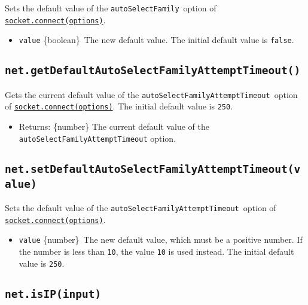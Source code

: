 Sets the default value of the \texttt{autoSelectFamily}~option of
\hyperref[socketconnectoptions-connectlistener]{\texttt{socket.connect(options)}}.

\begin{itemize}
\tightlist
\item
  \texttt{value} \{boolean\}~The new default value. The initial default
  value is \texttt{false}.
\end{itemize}

\subsection{\texorpdfstring{\texttt{net.getDefaultAutoSelectFamilyAttemptTimeout()}}{net.getDefaultAutoSelectFamilyAttemptTimeout()}}\label{net.getdefaultautoselectfamilyattempttimeout}

Gets the current default value of the
\texttt{autoSelectFamilyAttemptTimeout}~option of
\hyperref[socketconnectoptions-connectlistener]{\texttt{socket.connect(options)}}.
The initial default value is \texttt{250}.

\begin{itemize}
\tightlist
\item
  Returns: \{number\} The current default value of the
  \texttt{autoSelectFamilyAttemptTimeout} option.
\end{itemize}

\subsection{\texorpdfstring{\texttt{net.setDefaultAutoSelectFamilyAttemptTimeout(value)}}{net.setDefaultAutoSelectFamilyAttemptTimeout(value)}}\label{net.setdefaultautoselectfamilyattempttimeoutvalue}

Sets the default value of the
\texttt{autoSelectFamilyAttemptTimeout}~option of
\hyperref[socketconnectoptions-connectlistener]{\texttt{socket.connect(options)}}.

\begin{itemize}
\tightlist
\item
  \texttt{value} \{number\}~The new default value, which must be a
  positive number. If the number is less than \texttt{10}, the value
  \texttt{10} is used instead. The initial default value is
  \texttt{250}.
\end{itemize}

\subsection{\texorpdfstring{\texttt{net.isIP(input)}}{net.isIP(input)}}\label{net.isipinput}

